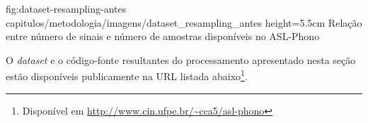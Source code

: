 \figura
{fig:dataset-resampling-antes} %
{capitulos/metodologia/imagens/dataset_resampling_antes} %
{height=5.5cm} %
{Relação entre número de sinais e número de amostras disponíveis no ASL-Phono} %
{} %


O \textit{dataset} e o código-fonte resultantes do processamento apresentado nesta seção estão disponíveis publicamente na URL listada abaixo\footnote{Disponível em \url{http://www.cin.ufpe.br/~cca5/asl-phono}}.
